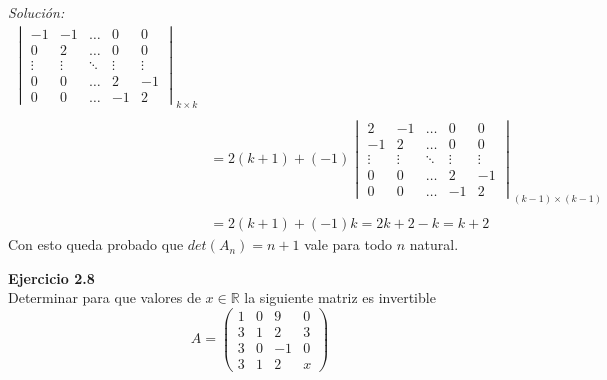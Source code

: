 \documentclass{article}
\newenvironment{problem}[2][Ejercicio]
    { \begin{mdframed}[backgroundcolor=gray!20] \textbf{#1 #2} \\}
    {  \end{mdframed}}
\newenvironment{solution}
    {\textit{Solución:}}
    {}
\begin{document}
\begin{solution}
\[\begin{aligned}
\begin{vmatrix} -1 & -1 & \dots & 0 & 0 \\ 0 & 2 & \dots & 0 & 0 \\ \vdots  & \vdots & \ddots & \vdots & \vdots \\ 0 & 0 & \dots & 2 & -1 \\ 0 & 0 & \dots & -1 & 2 \end{vmatrix}_{k\times k}  \\ \\
&= 2 (k+1) + (-1) 
\begin{vmatrix} 2 & -1 &  \dots & 0 & 0 \\  -1 & 2 & \dots & 0 & 0 \\ \vdots & \vdots & \ddots & \vdots & \vdots \\ 0 & 0 & \dots & 2 & -1 \\ 0 &0& \dots & -1 & 2 \end{vmatrix}_{(k-1)\times (k-1)}  \\ \\
&= 2 (k+1) + (-1)k = 2k+2-k = k+2
\end{aligned}
\]
Con esto queda probado que $det(A_n)=n+1$ vale para todo $n$ natural. \newline
\end{solution}
\newpage
\begin{problem}{2.8} 
    Determinar para que valores de $x\in \mathbb{R}$ la siguiente matriz es invertible
\[
A = \begin{pmatrix}
1 & 0 & 9 & 0 \\
3 & 1 & 2 & 3 \\
3 & 0 & -1 & 0 \\
3 & 1 & 2 & x
\end{pmatrix}
\]
\end{problem}
\end{document}
